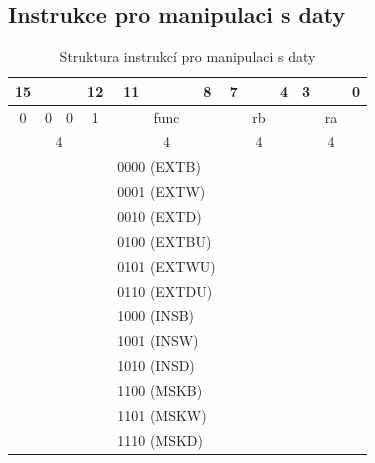 \documentclass[
  digital, %
  color,   %
  table,   %
  twoside, %
  nolof,   %
  nolot,   %
]{fithesis3}
\begin{document}
\subsection{Instrukce pro manipulaci s daty}
\label{subsec:datamanip}
\begin{table}[H]
\caption{Struktura instrukcí pro manipulaci s daty}
\begin{tabular}{lllllcccllllllll}
\multicolumn{1}{c}{15} & \multicolumn{1}{c}{} & \multicolumn{1}{c}{} & \multicolumn{1}{c}{12} & \multicolumn{1}{c}{11} &  &  & 8 & \multicolumn{1}{c}{7} & \multicolumn{1}{c}{} & \multicolumn{1}{c}{} & \multicolumn{1}{c}{4} & \multicolumn{1}{c}{3} & \multicolumn{1}{c}{} & \multicolumn{1}{c}{} & \multicolumn{1}{c}{0} \\ \hline
\multicolumn{1}{|c}{0} & \multicolumn{1}{c}{0} & \multicolumn{1}{c}{0} & \multicolumn{1}{c|}{1} & \multicolumn{4}{c|}{func} & \multicolumn{4}{c|}{rb} & \multicolumn{4}{c|}{ra} \\ \hline
\multicolumn{4}{c}{{\color[HTML]{656565} 4}} & \multicolumn{4}{c}{{\color[HTML]{656565} 4}} & \multicolumn{4}{c}{{\color[HTML]{656565} 4}} & \multicolumn{4}{c}{{\color[HTML]{656565} 4}} \\
 &  &  &  & \multicolumn{4}{l}{0000 (EXTB)} &  &  &  &  &  &  &  &  \\
 &  &  &  & \multicolumn{4}{l}{0001 (EXTW)} &  &  &  &  &  &  &  &  \\
 &  &  &  & \multicolumn{4}{l}{0010 (EXTD)} &  &  &  &  &  &  &  &  \\
 &  &  &  & \multicolumn{4}{l}{0100 (EXTBU)} &  &  &  &  &  &  &  &  \\
\multicolumn{1}{c}{} & \multicolumn{1}{c}{} &  &  & \multicolumn{4}{l}{0101 (EXTWU)} & \multicolumn{1}{c}{} & \multicolumn{1}{c}{} & \multicolumn{1}{c}{} & \multicolumn{1}{c}{} & \multicolumn{1}{c}{} & \multicolumn{1}{c}{} & \multicolumn{1}{c}{} & \multicolumn{1}{c}{} \\
\multicolumn{1}{c}{} & \multicolumn{1}{c}{} &  &  & \multicolumn{4}{l}{0110 (EXTDU)} & \multicolumn{1}{c}{} & \multicolumn{1}{c}{} & \multicolumn{1}{c}{} & \multicolumn{1}{c}{} & \multicolumn{1}{c}{} & \multicolumn{1}{c}{} & \multicolumn{1}{c}{} & \multicolumn{1}{c}{} \\
 &  &  &  & \multicolumn{4}{l}{1000 (INSB)} & \multicolumn{1}{c}{} & \multicolumn{1}{c}{} & \multicolumn{1}{c}{} & \multicolumn{1}{c}{} & \multicolumn{1}{c}{} &  &  &  \\
 &  &  &  & \multicolumn{4}{l}{1001 (INSW)} & \multicolumn{1}{c}{} & \multicolumn{1}{c}{} & \multicolumn{1}{c}{} & \multicolumn{1}{c}{} & \multicolumn{1}{c}{} &  &  &  \\
 &  &  &  & \multicolumn{4}{l}{1010 (INSD)} &  &  &  &  &  &  &  &  \\
 &  &  &  & \multicolumn{4}{l}{1100 (MSKB)} &  &  &  &  &  &  &  &  \\
 &  &  &  & \multicolumn{4}{l}{1101 (MSKW)} &  &  &  &  &  &  &  &  \\
 &  &  &  & \multicolumn{4}{l}{1110 (MSKD)} &  &  &  &  &  &  &  & 
\end{tabular}
\end{table}
\end{document}
